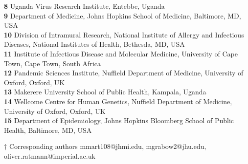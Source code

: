 \documentclass[10pt,letterpaper]{article}
\begin{document}
\begin{flushleft}
\textbf{8} Uganda Virus Research Institute, Entebbe, Uganda \\

\textbf{9} Department of Medicine, Johns Hopkins School of Medicine, Baltimore, MD, USA
\\
\textbf{10} Division of Intramural Research, National Institute of Allergy and Infectious Diseases, National Institutes of Health, Bethesda, MD, USA
\\
\textbf{11} Institute of Infectious Disease and Molecular Medicine, University of Cape Town, Cape Town, South Africa
\\
\textbf{12} Pandemic Sciences Institute, Nuffield Department of Medicine, University of Oxford, Oxford, UK \\

\textbf{13} Makerere University School of Public Health, Kampala, Uganda \\

\textbf{14} Wellcome Centre for Human Genetics, Nuffield Department of Medicine, University of Oxford, Oxford, UK \\

\textbf{15} Department of Epidemiology, Johns Hopkins Bloomberg School of Public Health, Baltimore, MD, USA \\

\bigskip

$\dagger$ Corresponding authors mmart108@jhmi.edu, mgrabow2@jhu.edu, oliver.ratmann@imperial.ac.uk 
\end{flushleft}


\end{document}
